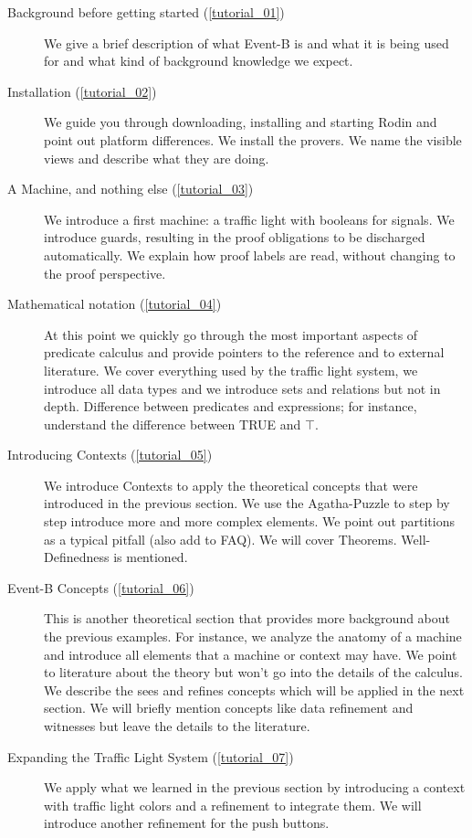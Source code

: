 \begin{description}
	\item[Background before getting started (\ref{tutorial_01})] We give a brief description of what Event-B is and what it is being used for and what kind of background knowledge we expect.
	\item[Installation (\ref{tutorial_02})] We guide you through downloading, installing and starting Rodin and point out platform differences.  We install the provers.  We name the visible views and describe what they are doing.
	\item[A Machine, and nothing else (\ref{tutorial_03})] We introduce a first machine: a traffic light with booleans for signals.  We introduce guards, resulting in the proof obligations to be discharged automatically.  We explain how proof labels are read, without changing to the proof perspective.
	\item[Mathematical notation (\ref{tutorial_04})] At this point we quickly go through the most important aspects of predicate calculus and provide pointers to the reference and to external literature.  We cover everything used by the traffic light system, we introduce all data types and we introduce sets and relations but not in depth.  Difference between predicates and expressions; for instance, understand the difference between TRUE and $\top$.  
	\item[Introducing Contexts (\ref{tutorial_05})] We introduce Contexts to apply the theoretical concepts that were introduced in the previous section.  We use the Agatha-Puzzle to step by step introduce more and more complex elements.  We point out partitions as a typical pitfall (also add to FAQ).  We will cover Theorems. Well-Definedness is mentioned.
	\item[Event-B Concepts (\ref{tutorial_06})] This is another theoretical section that provides more background about the previous examples.  For instance, we analyze the anatomy of a machine and introduce all elements that a machine or context may have. We point to literature about the theory but won't go into the details of the  calculus.  We describe the sees and refines concepts which will be applied in the next section.  We will briefly mention concepts like data refinement and witnesses but leave the details to the literature.
	\item[Expanding the Traffic Light System (\ref{tutorial_07})]  We apply what we learned in the previous section by introducing a context with traffic light colors and a refinement to integrate them.  We will introduce another refinement for the push buttons.


\end{description}
